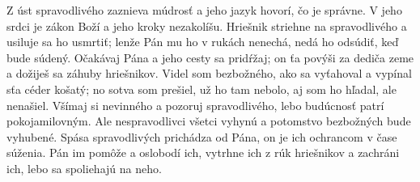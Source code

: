 Z úst spravodlivého zaznieva múdrosť
a jeho jazyk hovorí, čo je správne.
\versseparator
V jeho srdci je zákon Boží
a jeho kroky nezakolíšu.
\versseparator
Hriešnik striehne na spravodlivého
a usiluje sa ho usmrtiť;
\versseparator
lenže Pán mu ho v rukách nenechá,
nedá ho odsúdiť, keď bude súdený.
\versseparator
Očakávaj Pána a jeho cesty sa pridŕžaj;
on ťa povýši za dediča zeme
a dožiješ sa záhuby hriešnikov.
\versseparator
Videl som bezbožného, ako sa vyťahoval
a vypínal sťa céder košatý;
\versseparator
no sotva som prešiel, už ho tam nebolo,
aj som ho hľadal, ale nenašiel.
\versseparator
Všímaj si nevinného a pozoruj spravodlivého,
lebo budúcnosť patrí pokojamilovným.
\versseparator
Ale nespravodlivci všetci vyhynú
a potomstvo bezbožných bude vyhubené.
\versseparator
Spása spravodlivých prichádza od Pána,
on je ich ochrancom v čase súženia.
\versseparator
Pán im pomôže a oslobodí ich,
vytrhne ich z rúk hriešnikov a zachráni ich,
lebo sa spoliehajú na neho.

